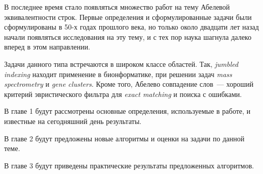 
В последнее время стало появляться множество работ на тему Абелевой эквивалентности строк. Первые определения и сформулированные задачи были сформулированы в 50-х годах прошлого века, но только около двадцати лет назад начали появляться исследования на эту тему, и с тех пор наука шагнула далеко вперед в этом направлении.

Задачи данного типа встречаются в широком классе областей. Так, \textit{jumbled indexing} находит применение в бионформатике, при решении задач \textit{mass spectrometry} и \textit{gene clusters}. Кроме того, Абелево совпадение слов~--- хороший критерий эвристического фильтра для \textit{exact matching} и поиска с ошибками.

В главе 1 будут рассмотрены основные определения, используемые в работе, и известные на сегодняшний день результаты.

В главе 2 будут предложены новые алгоритмы и оценки на задачи по данной теме.

В главе 3 будут приведены практические результаты предложенных алгоритмов.
